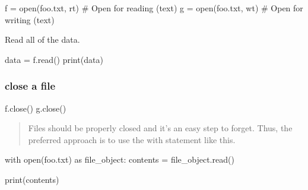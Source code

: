 \documentclass[
  letterpaper,
  DIV=11,
  numbers=noendperiod]{scrreprt}
\newenvironment{Shaded}{\begin{snugshade}}{\end{snugshade}}
\newcommand{\BuiltInTok}[1]{\textcolor[rgb]{0.00,0.46,0.62}{#1}}
\newcommand{\CommentTok}[1]{\textcolor[rgb]{0.37,0.37,0.37}{#1}}
\newcommand{\ControlFlowTok}[1]{\textcolor[rgb]{0.00,0.46,0.62}{#1}}
\newcommand{\ImportTok}[1]{\textcolor[rgb]{0.00,0.46,0.62}{#1}}
\newcommand{\NormalTok}[1]{\textcolor[rgb]{0.00,0.46,0.62}{#1}}
\newcommand{\OperatorTok}[1]{\textcolor[rgb]{0.37,0.37,0.37}{#1}}
\newcommand{\StringTok}[1]{\textcolor[rgb]{0.13,0.47,0.30}{#1}}
\begin{document}
\begin{Shaded}
\begin{Highlighting}[]
\NormalTok{f }\OperatorTok{=} \BuiltInTok{open}\NormalTok{(}\StringTok{\textquotesingle{}foo.txt\textquotesingle{}}\NormalTok{, }\StringTok{\textquotesingle{}rt\textquotesingle{}}\NormalTok{)     }\CommentTok{\# Open for reading (text)}
\NormalTok{g }\OperatorTok{=} \BuiltInTok{open}\NormalTok{(}\StringTok{\textquotesingle{}foo.txt\textquotesingle{}}\NormalTok{, }\StringTok{\textquotesingle{}wt\textquotesingle{}}\NormalTok{)     }\CommentTok{\# Open for writing (text)}
\end{Highlighting}
\end{Shaded}

Read all of the data.

\begin{Shaded}
\begin{Highlighting}[]
\NormalTok{data }\OperatorTok{=}\NormalTok{ f.read()}
\BuiltInTok{print}\NormalTok{(data)}
\end{Highlighting}
\end{Shaded}

\hypertarget{close-a-file}{%
\subsubsection{close a file}\label{close-a-file}}

\begin{Shaded}
\begin{Highlighting}[]
\NormalTok{f.close()}
\NormalTok{g.close()}
\end{Highlighting}
\end{Shaded}

\begin{quote}
Files should be properly closed and it's an easy step to forget. Thus,
the preferred approach is to use the with statement like this.
\end{quote}

\begin{Shaded}
\begin{Highlighting}[]
\ControlFlowTok{with} \BuiltInTok{open}\NormalTok{(}\StringTok{\textquotesingle{}foo.txt\textquotesingle{}}\NormalTok{) }\ImportTok{as}\NormalTok{ file\_object:}
\NormalTok{    contents }\OperatorTok{=}\NormalTok{ file\_object.read()}

\BuiltInTok{print}\NormalTok{(contents)}
\end{Highlighting}
\end{Shaded}
\end{document}
